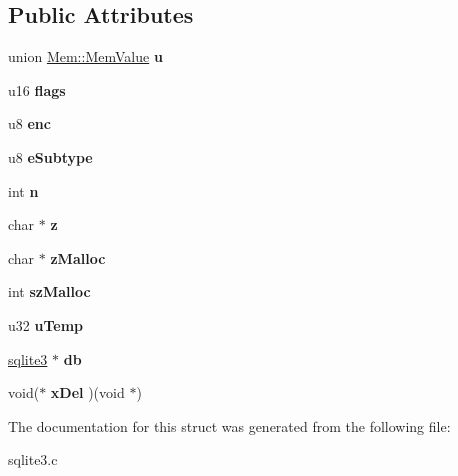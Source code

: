 \subsection*{Public Attributes}
\begin{DoxyCompactItemize}
\item 
union \hyperlink{unionMem_1_1MemValue}{Mem\+::\+Mem\+Value} {\bfseries u}\hypertarget{structMem_ac280628b51c0d03433ce3a05821b2911}{}\label{structMem_ac280628b51c0d03433ce3a05821b2911}

\item 
u16 {\bfseries flags}\hypertarget{structMem_a209bf3317161d1e33af9fe8b512f4974}{}\label{structMem_a209bf3317161d1e33af9fe8b512f4974}

\item 
u8 {\bfseries enc}\hypertarget{structMem_af437c99e92b8e729b70f82fa94e96bff}{}\label{structMem_af437c99e92b8e729b70f82fa94e96bff}

\item 
u8 {\bfseries e\+Subtype}\hypertarget{structMem_acb9ea95c050b4a96bd4c41386b05342a}{}\label{structMem_acb9ea95c050b4a96bd4c41386b05342a}

\item 
int {\bfseries n}\hypertarget{structMem_a5a613756e096c221ec68077c28424d84}{}\label{structMem_a5a613756e096c221ec68077c28424d84}

\item 
char $\ast$ {\bfseries z}\hypertarget{structMem_a85c51a0b445063ba913693517860f5ea}{}\label{structMem_a85c51a0b445063ba913693517860f5ea}

\item 
char $\ast$ {\bfseries z\+Malloc}\hypertarget{structMem_a68cd8f196d9dc8ab27845e1b4abbc95c}{}\label{structMem_a68cd8f196d9dc8ab27845e1b4abbc95c}

\item 
int {\bfseries sz\+Malloc}\hypertarget{structMem_a857df48ae7c5d3af4a8a8a3ed95bc873}{}\label{structMem_a857df48ae7c5d3af4a8a8a3ed95bc873}

\item 
u32 {\bfseries u\+Temp}\hypertarget{structMem_a36fce871381c6e796488034e41388a83}{}\label{structMem_a36fce871381c6e796488034e41388a83}

\item 
\hyperlink{structsqlite3}{sqlite3} $\ast$ {\bfseries db}\hypertarget{structMem_a478da33d1e83a23931b372f9ddc706f2}{}\label{structMem_a478da33d1e83a23931b372f9ddc706f2}

\item 
void($\ast$ {\bfseries x\+Del} )(void $\ast$)\hypertarget{structMem_a0d89e070132d482e8f3da755f0bb17bb}{}\label{structMem_a0d89e070132d482e8f3da755f0bb17bb}

\end{DoxyCompactItemize}


The documentation for this struct was generated from the following file\+:\begin{DoxyCompactItemize}
\item 
sqlite3.\+c\end{DoxyCompactItemize}
